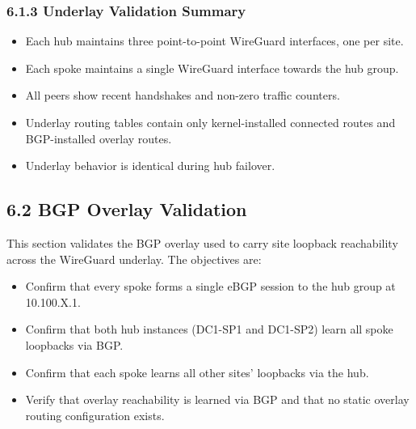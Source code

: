 \documentclass[11pt]{article}
\begin{document}
\subsubsection{6.1.3 Underlay Validation Summary}
\label{sec:underlay-validation-summary}

\begin{itemize}
  \item Each hub maintains three point-to-point WireGuard interfaces, one per site.
  \item Each spoke maintains a single WireGuard interface towards the hub group.
  \item All peers show recent handshakes and non-zero traffic counters.
  \item Underlay routing tables contain only kernel-installed connected routes and BGP-installed overlay routes.
  \item Underlay behavior is identical during hub failover.
\end{itemize}

%
%
%
\subsection{6.2 BGP Overlay Validation}
\label{sec:bgp-overlay-validation}

This section validates the BGP overlay used to carry site loopback reachability across the WireGuard underlay. The objectives are:

\begin{itemize}
  \item Confirm that every spoke forms a single eBGP session to the hub group at 10.100.X.1.
  \item Confirm that both hub instances (DC1-SP1 and DC1-SP2) learn all spoke loopbacks via BGP.
  \item Confirm that each spoke learns all other sites' loopbacks via the hub.
  \item Verify that overlay reachability is learned via BGP and that no static overlay routing configuration exists.
\end{itemize}
\end{document}
